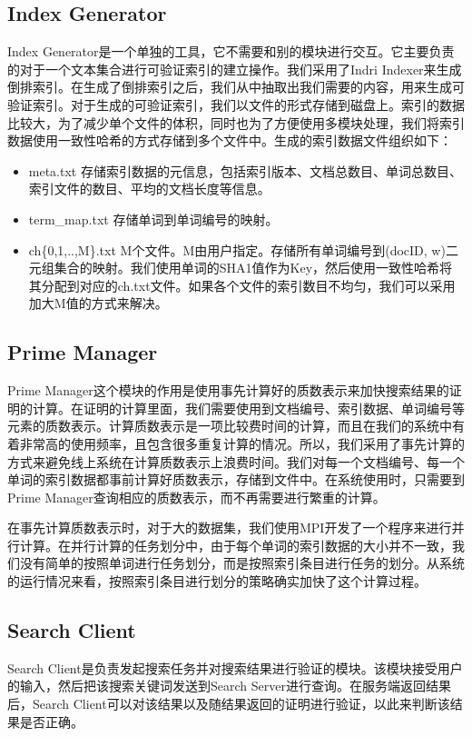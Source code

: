 \subsection{Index Generator}
Index Generator是一个单独的工具，它不需要和别的模块进行交互。它主要负责的对于一个文本集合进行可验证索引的建立操作。我们采用了Indri Indexer来生成倒排索引。在生成了倒排索引之后，我们从中抽取出我们需要的内容，用来生成可验证索引。对于生成的可验证索引，我们以文件的形式存储到磁盘上。索引的数据比较大，为了减少单个文件的体积，同时也为了方便使用多模块处理，我们将索引数据使用一致性哈希的方式存储到多个文件中。生成的索引数据文件组织如下：
\begin{itemize}
\item meta.txt 存储索引数据的元信息，包括索引版本、文档总数目、单词总数目、索引文件的数目、平均的文档长度等信息。
\item term\_map.txt 存储单词到单词编号的映射。
\item ch\{0,1,..,M\}.txt M个文件。M由用户指定。存储所有单词编号到(docID, w)二元组集合的映射。我们使用单词的SHA1值作为Key，然后使用一致性哈希将其分配到对应的ch.txt文件。如果各个文件的索引数目不均匀，我们可以采用加大M值的方式来解决。
\end{itemize}

\subsection{Prime Manager}
Prime Manager这个模块的作用是使用事先计算好的质数表示来加快搜索结果的证明的计算。在证明的计算里面，我们需要使用到文档编号、索引数据、单词编号等元素的质数表示。计算质数表示是一项比较费时间的计算，而且在我们的系统中有着非常高的使用频率，且包含很多重复计算的情况。所以，我们采用了事先计算的方式来避免线上系统在计算质数表示上浪费时间。我们对每一个文档编号、每一个单词的索引数据都事前计算好质数表示，存储到文件中。在系统使用时，只需要到Prime Manager查询相应的质数表示，而不再需要进行繁重的计算。

在事先计算质数表示时，对于大的数据集，我们使用MPI开发了一个程序来进行并行计算。在并行计算的任务划分中，由于每个单词的索引数据的大小并不一致，我们没有简单的按照单词进行任务划分，而是按照索引条目进行任务的划分。从系统的运行情况来看，按照索引条目进行划分的策略确实加快了这个计算过程。

\subsection{Search Client}
Search Client是负责发起搜索任务并对搜索结果进行验证的模块。该模块接受用户的输入，然后把该搜索关键词发送到Search Server进行查询。在服务端返回结果后，Search Client可以对该结果以及随结果返回的证明进行验证，以此来判断该结果是否正确。

